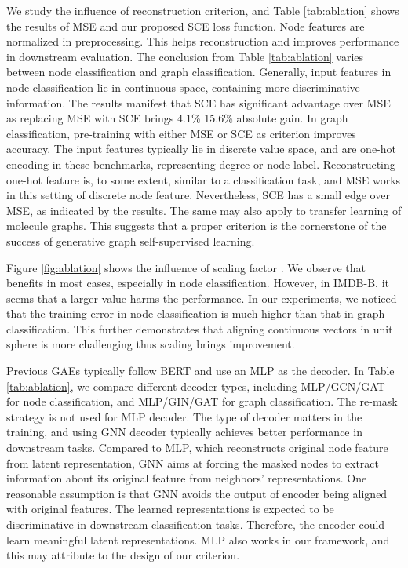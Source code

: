 { We study the influence of reconstruction criterion, and Table \ref{tab:ablation} shows the results of MSE and our proposed SCE loss function. Node features are normalized in preprocessing. This helps reconstruction and improves performance in downstream evaluation. The conclusion from Table \ref{tab:ablation} varies between node classification and graph classification.
Generally, input features in node classification lie in continuous space, containing more discriminative information.
The results manifest that SCE has significant advantage over MSE as replacing MSE with SCE brings 4.1\%  15.6\% absolute gain.
In graph classification, pre-training with either MSE or SCE as criterion improves accuracy. The input features typically lie in discrete value space, and are one-hot encoding in these benchmarks, representing degree or node-label. Reconstructing one-hot feature is, to some extent, similar to a classification task, and MSE works in this setting of discrete node feature.  Nevertheless, SCE has a small edge over MSE, as indicated by the results.
The same may also apply to transfer learning of molecule graphs. 
This suggests that a proper criterion is the cornerstone of the success of generative graph self-supervised learning.


Figure \ref{fig:ablation} shows the influence of scaling factor .  We observe that  benefits in most cases, especially in node classification. However, in IMDB-B, it seems that a larger  value harms the performance. In our experiments, we noticed that the training error in node classification is much higher than that in graph classification. This further demonstrates that aligning continuous vectors in unit sphere is more challenging thus scaling  brings improvement. 


 Previous GAEs typically follow BERT and use an MLP as the decoder. In Table \ref{tab:ablation}, we compare different decoder types, including MLP/GCN/GAT for node classification, and MLP/GIN/GAT for graph classification. The re-mask strategy is not used for MLP decoder.  The type of decoder matters in the training, and using GNN decoder typically achieves better performance in downstream tasks. Compared to MLP, which reconstructs original node feature from latent representation, GNN aims at forcing the masked nodes to extract information about its original feature from neighbors' representations. One reasonable assumption is that GNN avoids the output of encoder being aligned with original features. The learned representations is expected to be discriminative in downstream classification tasks. Therefore, the encoder could learn meaningful latent representations. MLP also works in our framework, and this may attribute to the design of our criterion.

}
